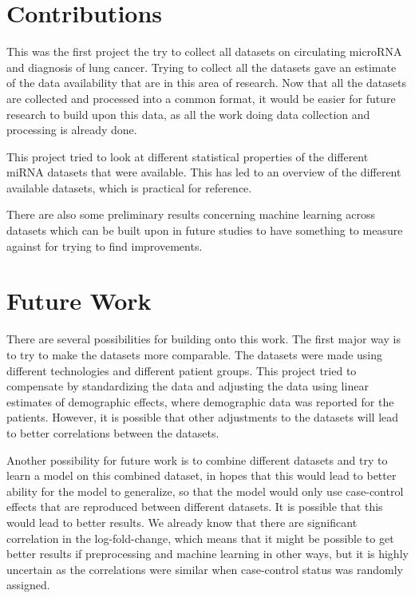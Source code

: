 \section{Contributions}
\label{sec:contributions}

This was the first project the try to collect all datasets on circulating microRNA and diagnosis of lung cancer. Trying to collect all the datasets gave an estimate of the data availability that are in this area of research. Now that all the datasets are collected and processed into a common format, it would be easier for future research to build upon this data, as all the work doing data collection and processing is already done.

This project tried to look at different statistical properties of the different miRNA datasets that were available. This has led to an overview of the different available datasets, which is practical for reference.

There are also some preliminary results concerning machine learning across datasets which can be built upon in future studies to have something to measure against for trying to find improvements.

\section{Future Work}
\label{sec:future_work}

There are several possibilities for building onto this work. The first major way is to try to make the datasets more comparable. The datasets were made using different technologies and different patient groups. This project tried to compensate by standardizing the data and adjusting the data using linear estimates of demographic effects, where demographic data was reported for the patients. However, it is possible that other adjustments to the datasets will lead to better correlations between the datasets.

Another possibility for future work is to combine different datasets and try to learn a model on this combined dataset, in hopes that this would lead to better ability for the model to generalize, so that the model would only use case-control effects that are reproduced between different datasets. It is possible that this would lead to better results. We already know that there are significant correlation in the log-fold-change, which means that it might be possible to get better results if preprocessing and machine learning in other ways, but it is highly uncertain as the correlations were similar when case-control status was randomly assigned.

